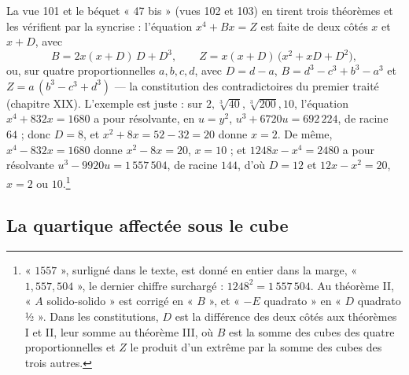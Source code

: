 \documentclass[11pt,a4paper]{article}
\begin{document}
La vue 101 et le béquet « 47 bis » (vues 102 et 103) en tirent trois théorèmes et
les vérifient par la syncrise : l'équation $x^4 + Bx = Z$ est faite de deux côtés
$x$ et $x + D$, avec
\[ B = 2x(x + D)\,D + D^3 , \qquad Z = x(x + D)\,\bigl(x^2 + xD + D^2\bigr) , \]
ou, sur quatre proportionnelles $a, b, c, d$, avec $D = d - a$,
$B = d^3 - c^3 + b^3 - a^3$ et $Z = a\,(b^3 - c^3 + d^3)$ — la constitution des
contradictoires du premier traité (chapitre XIX). L'exemple est juste : sur
$2, \sqrt[3]{40}, \sqrt[3]{200}, 10$, l'équation $x^4 + 832x = 1680$ a pour
résolvante, en $u = y^2$, $u^3 + 6720u = 692\,224$, de racine $64$ ; donc $D = 8$,
et $x^2 + 8x = 52 - 32 = 20$ donne $x = 2$. De même, $x^4 - 832x = 1680$ donne
$x^2 - 8x = 20$, $x = 10$ ; et $1248x - x^4 = 2480$ a pour résolvante
$u^3 - 9920u = 1\,557\,504$, de racine $144$, d'où $D = 12$ et $12x - x^2 = 20$,
$x = 2$ ou $10$.\footnote{« $1557$ », surligné dans le texte, est donné en entier
dans la marge, « $1{,}557{,}504$ », le dernier chiffre surchargé : $1248^2 =
1\,557\,504$. Au théorème II, « $A$ solido-solido » est corrigé en « $B$ », et
« $-E$ quadrato » en « $D$ quadrato ½ ». Dans les constitutions, $D$ est la
différence des deux côtés aux théorèmes I et II, leur somme au théorème III, où
$B$ est la somme des cubes des quatre proportionnelles et $Z$ le produit d'un
extrême par la somme des cubes des trois autres.}

\subsection*{La quartique affectée sous le cube}
\end{document}
